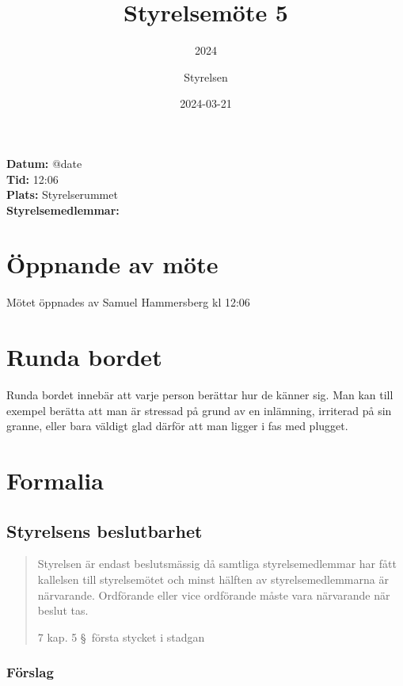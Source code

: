 \documentclass[protokoll]{dvd}
\begin{document}
\title{Styrelsemöte 5}
\subtitle{2024}
\author{Styrelsen}
\date{2024-03-21}


\textbf{Datum:} \csname @date\endcsname\\
\textbf{Tid:} 12:06\\
\textbf{Plats:} Styrelserummet\\
\textbf{Styrelsemedlemmar:}
\begin{närvarande_förtroendevalda}
\end{närvarande_förtroendevalda}

\section{Öppnande av möte}

Mötet öppnades av Samuel Hammersberg kl 12:06

\section{Runda bordet}

Runda bordet innebär att varje person berättar hur de känner sig.
Man kan till exempel berätta att man är stressad på grund av en inlämning, irriterad på sin granne, eller bara väldigt glad därför att man ligger i fas med plugget.

\section{Formalia}

\subsection{Styrelsens beslutbarhet}

\blockquote[7 kap. 5 \S~första stycket i stadgan][]{%
    Styrelsen är endast beslutsmässig då samtliga styrelsemedlemmar har fått kallelsen till styrelsemötet och minst hälften av styrelsemedlemmarna är närvarande.
    Ordförande eller vice ordförande måste vara närvarande när beslut tas.
}

\subsubsection*{Förslag}
\end{document}
